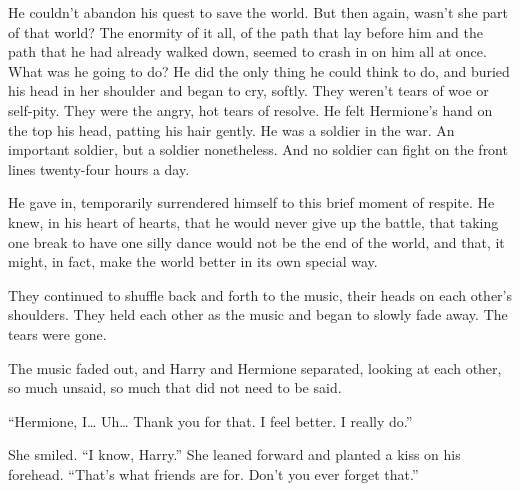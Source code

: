 He couldn’t abandon his quest to save the world. But then again, wasn’t she part of that world? The enormity of it all, of the path that lay before him and the path that he had already walked down, seemed to crash in on him all at once.
\SmallVSpace
What was he going to do?
\SmallVSpace
He did the only thing he could think to do, and buried his head in her shoulder and began to cry, softly. They weren’t tears of woe or self-pity. They were the angry, hot tears of resolve. He felt Hermione’s hand on the top his head, patting his hair gently. He was a soldier in the war. An important soldier, but a soldier nonetheless. And no soldier can fight on the front lines twenty-four hours a day.


He gave in, temporarily surrendered himself to this brief moment of respite. He knew, in his heart of hearts, that he would never give up the battle, that taking one break to have one silly dance would not be the end of the world, and that, it might, in fact, make the world better in its own special way.

\SmallVSpace
They continued to shuffle back and forth to the music, their heads on each other’s shoulders. They held each other as the music and began to slowly fade away. The tears were gone.


The music faded out, and Harry and Hermione separated, looking at each other, so much unsaid, so much that did not need to be said.

“Hermione, I… Uh… Thank you for that. I feel better. I really do.”

She smiled. “I know, Harry.” She leaned forward and planted a kiss on his forehead. “That’s what friends are for. Don’t you ever forget that.”